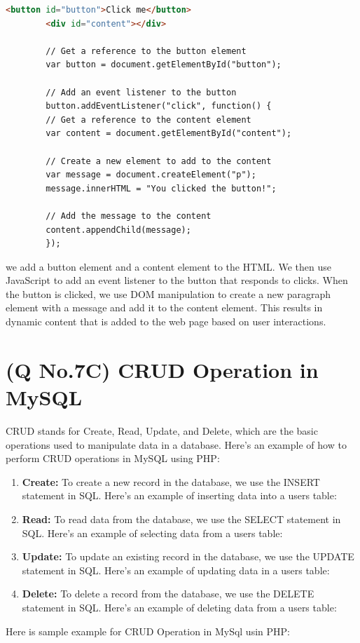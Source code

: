 \documentclass[11pt]{article}
\begin{document}
    \begin{lstlisting}[language=html]
        <button id="button">Click me</button>
        <div id="content"></div>

        // Get a reference to the button element
        var button = document.getElementById("button");

        // Add an event listener to the button
        button.addEventListener("click", function() {
        // Get a reference to the content element
        var content = document.getElementById("content");
        
        // Create a new element to add to the content
        var message = document.createElement("p");
        message.innerHTML = "You clicked the button!";
        
        // Add the message to the content
        content.appendChild(message);
        });

    \end{lstlisting}
we add a button element and a content element to the HTML. We then use JavaScript to add an event listener to the button that responds to clicks. When the button is clicked, we use DOM manipulation to create a new paragraph element with a message and add it to the content element. This results in dynamic content that is added to the web page based on user interactions.

\section{(Q No.7C) CRUD Operation in MySQL} 
CRUD stands for Create, Read, Update, and Delete, which are the basic operations used to manipulate data in a database. Here's an example of how to perform CRUD operations in MySQL using PHP:

\begin{enumerate}
    \item \textbf{Create:} To create a new record in the database, we use the INSERT statement in SQL. Here's an example of inserting data into a users table:

    \item \textbf{Read:} To read data from the database, we use the SELECT statement in SQL. Here's an example of selecting data from a users table:
    
    \item \textbf{Update:} To update an existing record in the database, we use the UPDATE statement in SQL. Here's an example of updating data in a users table:
    
    \item \textbf{Delete:} To delete a record from the database, we use the DELETE statement in SQL. Here's an example of deleting data from a users table:
\end{enumerate}
Here is sample example for CRUD Operation in MySql usin PHP:
\end{document}
